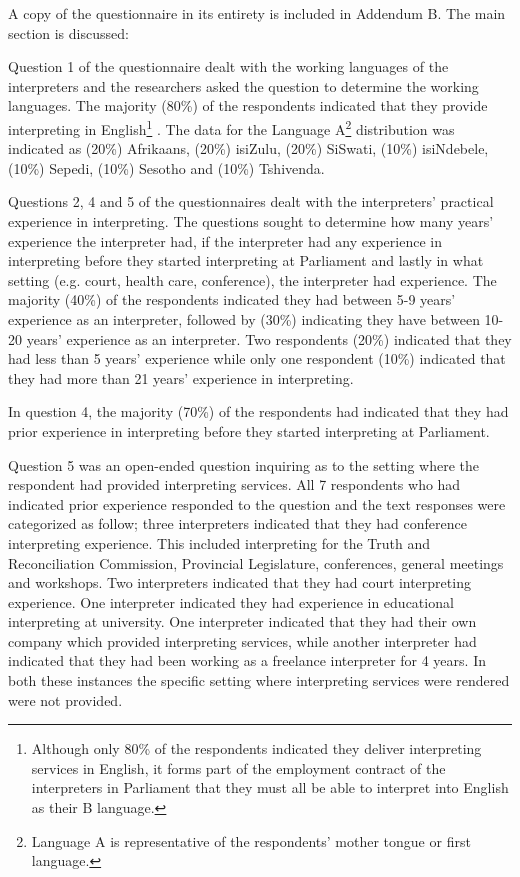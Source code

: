 \documentclass[output=paper]{langsci/langscibook}
\begin{document}
A copy of the questionnaire in its entirety is included in Addendum B. The main section is discussed:

Question 1 of the questionnaire dealt with the working languages of the interpreters and the researchers asked the question to determine the working languages. The majority (80\%) of the respondents indicated that they provide interpreting in English\footnote{Although only 80\% of the respondents indicated they deliver interpreting services in English, it forms part of the employment contract of the interpreters in Parliament that they must all be able to interpret into English as their B language.} . The data for the Language A\footnote{Language A is representative of the respondents’ mother tongue or first language.}  distribution was indicated as (20\%) Afrikaans, (20\%) isiZulu, (20\%) SiSwati, (10\%) isiNdebele, (10\%) Sepedi, (10\%) Sesotho and (10\%) Tshivenda. 

Questions 2, 4 and 5 of the questionnaires dealt with the interpreters’ practical experience in interpreting. The questions sought to determine how many years’ experience the interpreter had, if the interpreter had any experience in interpreting before they started interpreting at Parliament and lastly in what setting (e.g. court, health care, conference), the interpreter had experience. The majority (40\%) of the respondents indicated they had between 5-9 years’ experience as an interpreter, followed by (30\%) indicating they have between 10-20 years’ experience as an interpreter. Two respondents (20\%) indicated that they had less than 5 years’ experience while only one respondent (10\%) indicated that they had more than 21 years’ experience in interpreting.  

In question 4, the majority (70\%) of the respondents had indicated that they had prior experience in interpreting before they started interpreting at Parliament.  

Question 5 was an open-ended question inquiring as to the setting where the respondent had provided interpreting services. All 7 respondents who had indicated prior experience responded to the question and the text responses were categorized as follow; three interpreters indicated that they had conference interpreting experience. This included interpreting for the Truth and Reconciliation Commission, Provincial Legislature, conferences, general meetings and workshops. Two interpreters indicated that they had court interpreting experience. One interpreter indicated they had experience in educational interpreting at university. One interpreter indicated that they had their own company which provided interpreting services, while another interpreter had indicated that they had been working as a freelance interpreter for 4 years. In both these instances the specific setting where interpreting services were rendered were not provided. 
\end{document}
